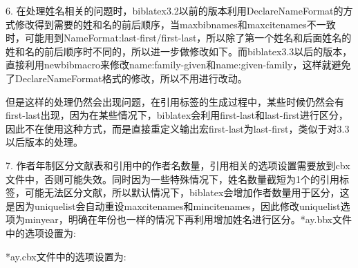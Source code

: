 6. 在处理姓名相关的问题时，biblatex3.2以前的版本利用DeclareNameFormat的方式修改得到需要的姓和名的前后顺序，当maxbibnames和maxcitenames不一致时，可能用到NameFormat:last-first/first-last，所以除了第一个姓名和后面姓名的姓和名的前后顺序时不同的，所以进一步做修改如下。而biblatex3.3以后的版本，直接利用newbibmacro来修改name:family-given和name:given-family，这样就避免了DeclareNameFormat格式的修改，所以不用进行改动。
\begin{texlist}

\end{texlist}

但是这样的处理仍然会出现问题，在引用标签的生成过程中，某些时候仍然会有first-last出现，因为在某些情况下，biblatex会利用first-last和last-first进行区分，因此不在使用这种方式，而是直接重定义输出宏first-last为last-first，类似于对3.3以后版本的处理。

7. 作者年制区分文献表和引用中的作者名数量，引用相关的选项设置需要放到cbx文件中，否则可能失效。同时因为一些特殊情况下，姓名数量截短为1个的引用标签，可能无法区分文献，所以默认情况下，biblatex会增加作者数量用于区分，这是因为uniquelist会自动重设maxcitenames和mincitenames，因此修改uniquelist选项为minyear，明确在年份也一样的情况下再利用增加姓名进行区分。*ay.bbx文件中的选项设置为:
\begin{texlist}
\end{texlist}
*ay.cbx文件中的选项设置为:
\begin{texlist}
\end{texlist}

